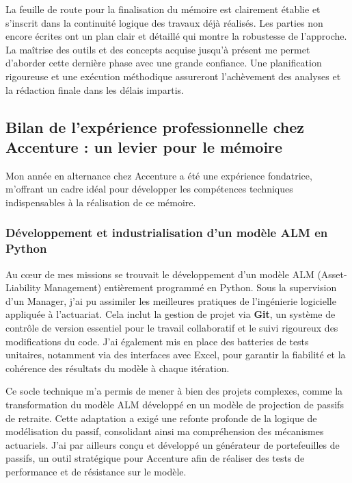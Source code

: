 La feuille de route pour la finalisation du mémoire est clairement établie et s'inscrit dans la continuité logique des travaux déjà réalisés. Les parties non encore écrites ont un plan clair et détaillé qui montre la robustesse de l'approche. La maîtrise des outils et des concepts acquise jusqu'à présent me permet d'aborder cette dernière phase avec une grande confiance. Une planification rigoureuse et une exécution méthodique assureront l'achèvement des analyses et la rédaction finale dans les délais impartis.

\subsection{Bilan de l'expérience professionnelle chez Accenture : un levier pour le mémoire}



Mon année en alternance chez Accenture a été une expérience fondatrice, m'offrant un cadre idéal pour développer les compétences techniques indispensables à la réalisation de ce mémoire.



\subsubsection{Développement et industrialisation d'un modèle ALM en Python}

Au cœur de mes missions se trouvait le développement d'un modèle ALM (Asset-Liability Management) entièrement programmé en Python. Sous la supervision d'un Manager, j'ai pu assimiler les meilleures pratiques de l'ingénierie logicielle appliquée à l'actuariat. Cela inclut la gestion de projet via \textbf{Git}, un système de contrôle de version essentiel pour le travail collaboratif et le suivi rigoureux des modifications du code. J'ai également mis en place des batteries de tests unitaires, notamment via des interfaces avec Excel, pour garantir la fiabilité et la cohérence des résultats du modèle à chaque itération.



Ce socle technique m'a permis de mener à bien des projets complexes, comme la transformation du modèle ALM développé en un modèle de projection de passifs de retraite. Cette adaptation a exigé une refonte profonde de la logique de modélisation du passif, consolidant ainsi ma compréhension des mécanismes actuariels. J'ai par ailleurs conçu et développé un générateur de portefeuilles de passifs, un outil stratégique pour Accenture afin de réaliser des tests de performance et de résistance sur le modèle.



